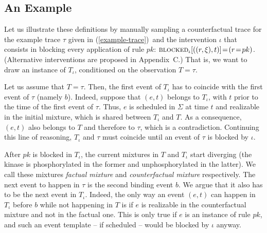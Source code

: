 \subsection{An Example}\label{subsec:counterfactuals-example}


\newcommand{\RTrace}{T} 
\newcommand{\ATrace}{T_\iota}

Let us illustrate these definitions by manually sampling a
counterfactual trace for the example trace $\tau$ given in
(\ref{example-trace})\, and the intervention $\iota$ that consists in
blocking every application of rule $pk$:
${\textsc{blocked}}_{\iota}[((r, \xi), t)] \!=\! (r \!=\! pk)$.  (Alternative
interventions are proposed in Appendix~C.)  That is, we want to draw
an instance of $\ATrace$, conditioned on the observation
$\RTrace \!=\! \tau$.

Let us assume that $\RTrace \!=\! \tau$. Then, the first event of
$\ATrace$ has to coincide with the first event of $\tau$ (namely $b$).
Indeed, suppose that $(e, t)$ belongs to $\ATrace$, with $t$ prior to
the time of the first event of $\tau$. Thus, $e$ is scheduled in
$\Sigma$ at time $t$ and realizable in the initial mixture, which is
shared between $\ATrace$ and $\RTrace$. As a consequence, $(e, t)$
also belongs to $\RTrace$ and therefore to $\tau$, which is a
contradiction. Continuing this line of reasoning, $\ATrace$ and $\tau$
must coincide until an event of $\tau$ is blocked by $\iota$.

After $pk$ is blocked in $\ATrace$, the current mixtures in $T$ and
$T_\iota$ start diverging (the kinase is phosphorylated in the former
and unphosphorylated in the latter). We call these mixtures
\emph{factual mixture} and \emph{counterfactual mixture} respectively.
The next event to happen in $\tau$ is the second binding event $b$. We
argue that it also has to be the next event in $T_\iota$. Indeed, the
only way an event $(e, t)$ can happen in $\ATrace$ before $b$ while
not happening in $\RTrace$ is if $e$ is realizable in the
counterfactual mixture and not in the factual one. This is only true
if $e$ is an instance of rule $pk$, and such an event template -- if
scheduled -- would be blocked by $\iota$ anyway.

